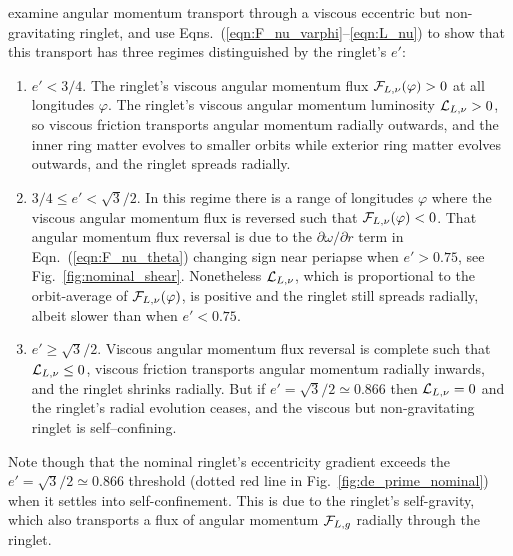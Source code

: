 \documentclass[preprint]{aastex62}
\begin{document}
\citet{BGT82} examine angular momentum transport through a viscous eccentric but non-gravitating ringlet, 
and use Eqns.\ (\ref{eqn:F_nu_varphi}--\ref{eqn:L_nu}) to show that this transport has three 
regimes distinguished by the ringlet's $e'$:

\begin{enumerate}

\item $e'<3/4$. The ringlet's viscous angular momentum flux ${\cal F}_{L,\nu}(\varphi)>0$
at all longitudes $\varphi$. The ringlet's viscous
angular momentum luminosity ${\cal L}_{L,\nu}>0$, so viscous friction transports angular momentum radially outwards,
and the inner ring matter evolves to smaller orbits while exterior ring matter evolves outwards, and
the ringlet spreads radially.

\item $3/4\le e'<\sqrt{3}/2$. In this regime there is a range of longitudes $\varphi$
where the viscous angular momentum flux is reversed such that ${\cal F}_{L,\nu}(\varphi)<0$. 
That angular momentum flux reversal is due to the $\partial\omega/\partial r$
term in Eqn.\ (\ref{eqn:F_nu_theta}) changing sign near periapse when $e'>0.75$, 
see Fig.\ \ref{fig:nominal_shear}.
Nonetheless ${\cal L}_{L,\nu}$, which is proportional to the orbit-average of ${\cal F}_{L,\nu}(\varphi)$,
is positive and the ringlet still spreads radially, albeit slower than when $e'<0.75$.

\item $e'\ge\sqrt{3}/2$. Viscous angular momentum flux reversal is complete such that ${\cal L}_{L,\nu}\le0$,
viscous friction transports angular momentum radially inwards, and the ringlet
shrinks radially. But if $e'=\sqrt{3}/2\simeq0.866$ then ${\cal L}_{L,\nu}=0$ and the ringlet's
radial evolution ceases, and the viscous but non-gravitating ringlet is self--confining.

\end{enumerate}
 
Note though that the nominal ringlet's eccentricity gradient
exceeds the $e'=\sqrt{3}/2\simeq0.866$ threshold 
(dotted red line in Fig.\ \ref{fig:de_prime_nominal}) when it settles into
self-confinement. This is due to the ringlet's self-gravity,
which also transports a flux of angular momentum ${\cal F}_{L,g}$ radially through the ringlet.
\end{document}
